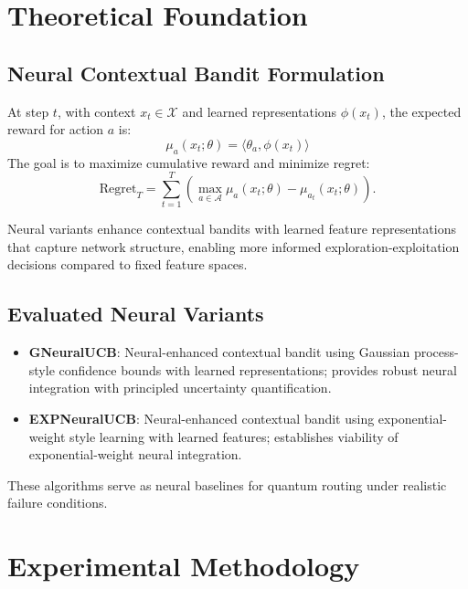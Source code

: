 \documentclass[12pt,a4paper]{article}
\begin{document}
\section{Theoretical Foundation}

\subsection{Neural Contextual Bandit Formulation}
At step $t$, with context $x_t \in \mathcal{X}$ and learned representations $\phi(x_t)$, the expected reward for action $a$ is:
\[
\mu_a(x_t; \theta) = \langle \theta_a, \phi(x_t) \rangle
\]
The goal is to maximize cumulative reward and minimize regret:
\[
\mathrm{Regret}_T = \sum_{t=1}^{T}\left(\max_{a \in \mathcal{A}} \mu_a(x_t;\theta) - \mu_{a_t}(x_t;\theta)\right).
\]

Neural variants enhance contextual bandits with learned feature representations that capture network structure, enabling more informed exploration-exploitation decisions compared to fixed feature spaces.

\subsection{Evaluated Neural Variants}
\begin{itemize}
\item \textbf{GNeuralUCB}: Neural-enhanced contextual bandit using Gaussian process-style confidence bounds with learned representations; provides robust neural integration with principled uncertainty quantification.
\item \textbf{EXPNeuralUCB}: Neural-enhanced contextual bandit using exponential-weight style learning with learned features; establishes viability of exponential-weight neural integration.
\end{itemize}

These algorithms serve as neural baselines for quantum routing under realistic failure conditions.

\section{Experimental Methodology}
\end{document}
